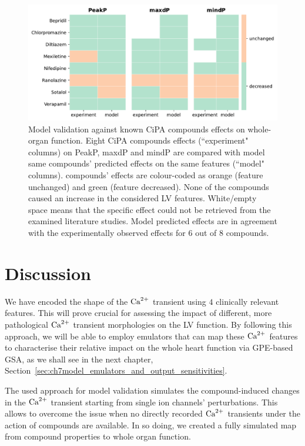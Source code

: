\begin{figure}[ht!]
    \myfloatalign
    \includegraphics[width=\textwidth]{figures/chapter06/model_vs_experiments.pdf}
    \caption{Model validation against known CiPA compounds effects on whole-organ function. Eight CiPA compounds effects (``experiment" columns) on PeakP, maxdP and mindP are compared with model same compounds' predicted effects on the same features (``model" columns). compounds' effects are colour-coded as orange (feature unchanged) and green (feature decreased). None of the compounds caused an increase in the considered LV features. White/empty space means that the specific effect could not be retrieved from the examined literature studies. Model predicted effects are in agreement with the experimentally observed effects for $6$ out of $8$ compounds.}
    \label{fig:validationtable}
\end{figure}


%
%
%
\section{Discussion}\label{sec:ch6discussion}
We have encoded the shape of the $\textrm{Ca}^{2+}$ transient using $4$ clinically relevant features. This will prove crucial for assessing the impact of different, more pathological $\textrm{Ca}^{2+}$ transient morphologies on the LV function. By following this approach, we will be able to employ emulators that can map these $\textrm{Ca}^{2+}$ features to characterise their relative impact on the whole heart function via GPE-based GSA, as we shall see in the next chapter, Section~\ref{sec:ch7model_emulators_and_output_sensitivities}.

\vspace{0.2cm}
The used approach for model validation simulates the compound-induced changes in the $\textrm{Ca}^{2+}$ transient starting from single ion channels' perturbations. This allows to overcome the issue when no directly recorded $\textrm{Ca}^{2+}$ transients under the action of compounds are available. In so doing, we created a fully simulated map from compound properties to whole organ function.


